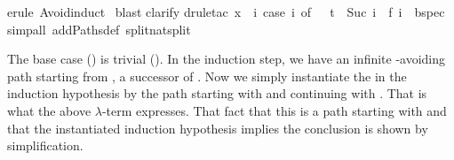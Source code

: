 \begin{isabellebody}
erule\ Avoid{\isachardot}induct{\isacharparenright}\isanewline
\ blast{\isacharparenright}\isanewline
{}clarify{\isacharparenright}\isanewline
{}drule{\isacharunderscore}tac\ x\ {\isacharequal}\ {\isachardoublequote}{\isasymlambda}i{\isachardot}\ case\ i\ of\ {}\ {\isasymRightarrow}\ t\ {\isacharbar}\ Suc\ i\ {\isasymRightarrow}\ f\ i{\isachardoublequote}\ \ bspec{\isacharparenright}\isanewline
{}simp{\isacharunderscore}all\ add{\isacharcolon}Paths{\isacharunderscore}def\ split{\isacharcolon}nat{\isachardot}split{\isacharparenright}\isanewline
{}%
\begin{isamarkuptext}%
\noindent
The base case () is trivial ().
In the induction step, we have an infinite -avoiding path 
starting from , a successor of . Now we simply instantiate
the  in the induction hypothesis by the path starting with
 and continuing with . That is what the above $\lambda$-term
expresses. That fact that this is a path starting with  and that
the instantiated induction hypothesis implies the conclusion is shown by
simplification.


\end{isamarkuptext}
\end{isabellebody}
